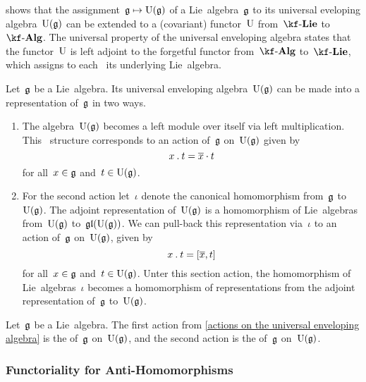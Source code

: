 \begin{remark}
	 shows that the assignment~$\glie \mapsto \Univ(\glie)$ of a Lie~algebra~$\mathfrak{g}$ to its universal eveloping algebra~$\Univ(\glie)$ can be extended to a (covariant) functor~$\operatorname{U}$ from~$\cLie{\kf}$ to~$\cAlg{\kf}$.
	The universal property of the universal enveloping algebra states that the functor~$\operatorname{U}$ is left adjoint to the forgetful functor from~$\cAlg{\kf}$ to~$\cLie{\kf}$, which assigns to each~{\algebra{$\kf$}} its underlying Lie~algebra.
\end{remark}


\begin{remark}
	\label{actions on the universal enveloping algebra}
	Let~$\mathfrak{g}$ be a Lie~algebra.
	Its universal enveloping algebra~$\Univ(\glie)$ can be made into a representation of~$\mathfrak{g}$ in two ways.
	\begin{enumerate}
		\item
			The algebra~$\Univ(\glie)$ becomes a left module over itself via left multiplication.
			This~\module{$\Univ(\glie)$} structure corresponds to an action of~$\mathfrak{g}$ on~$\Univ(\glie)$ given by
			\[
				x \mathbin{.} t
				=
				\overline{x} \cdot t
			\]
			for all~$x \in \mathfrak{g}$ and~$t \in \operatorname{U}(\mathfrak{g})$.
		\item
			For the second action let~$\iota$ denote the canonical homomorphism from~$\mathfrak{g}$ to~$\Univ(\glie)$.
			The adjoint representation of~$\Univ(\glie)$ is a homomorphism of Lie~algebras from~$\Univ(\glie)$ to~$\mathfrak{gl}(\operatorname{U}(\mathfrak{g}))$.
			We can pull-back this representation via~$\iota$ to an action of~$\mathfrak{g}$ on~$\Univ(\glie)$, given by
			\[
				x \mathbin{.} t
				=
				[ \overline{x}, t ]
			\]
			for all~$x \in \mathfrak{g}$ and~$t \in \operatorname{U}(\mathfrak{g})$.
			Unter this section action, the homomorphism of Lie~algebras~$\iota$ becomes a homomorphism of representations from the adjoint representation of~$\mathfrak{g}$ to~$\Univ(\glie)$.
	\end{enumerate}
\end{remark}


\begin{definition}
	Let~$\mathfrak{g}$ be a Lie~algebra.
	The first action from \cref{actions on the universal enveloping algebra} is the  of~$\mathfrak{g}$ on~$\Univ(\glie)$, and the second action is the  of~$\mathfrak{g}$ on~$\Univ(\glie)$.
\end{definition}

\subsubsection{Functoriality for Anti-Homomorphisms}

